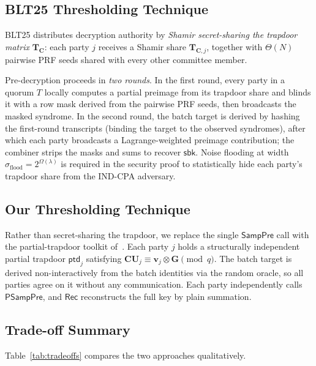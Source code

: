 \subsection{BLT25 Thresholding Technique}

\textsf{BLT25} distributes decryption authority by \emph{Shamir secret-sharing the
trapdoor matrix} $\mathbf{T}_{\mathbf{C}}$: each party $j$ receives a Shamir share
$\mathbf{T}_{\mathbf{C},j}$, together with $\Theta(N)$ pairwise PRF seeds shared with
every other committee member.

Pre-decryption proceeds in \emph{two rounds}.
In the first round, every party in a quorum $T$ locally computes a partial preimage
from its trapdoor share and blinds it with a row mask derived from the pairwise PRF
seeds, then broadcasts the masked syndrome.
In the second round, the batch target is derived by hashing the first-round transcripts
(binding the target to the observed syndromes), after which each party broadcasts a
Lagrange-weighted preimage contribution; the combiner strips the masks and sums to
recover $\mathsf{sbk}$.
Noise flooding at width $\sigma_{\mathrm{flood}}=2^{\Omega(\lambda)}$ is required in
the security proof to statistically hide each party's trapdoor share from the IND-CPA
adversary.

\subsection{Our Thresholding Technique}

Rather than secret-sharing the trapdoor, we replace the single $\mathsf{SampPre}$ call
with the partial-trapdoor toolkit of~\cite{AC:ALLW25}.
Each party $j$ holds a structurally independent partial trapdoor $\mathsf{ptd}_j$
satisfying $\mathbf{C}\mathbf{U}_j \equiv \mathbf{v}_j\otimes\mathbf{G}\pmod{q}$.
The batch target is derived non-interactively from the batch identities via the random
oracle, so all parties agree on it without any communication.
Each party independently calls $\mathsf{PSampPre}$, and $\mathsf{Rec}$ reconstructs the
full key by plain summation.

\subsection{Trade-off Summary}

Table~\ref{tab:tradeoffs} compares the two approaches qualitatively.

